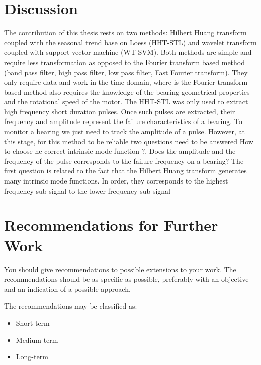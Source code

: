\documentclass[thesis.tex]{subfiles}
\begin{document}
	\section{Discussion}
	\label{sec:discussion}
	The contribution of this thesis rests on two methods: Hilbert Huang transform coupled with the seasonal trend base on Loess (HHT-STL) and wavelet transform coupled with support vector machine (WT-SVM). Both methods are simple and require less transformation as opposed to the Fourier transform based method (band pass filter, high pass filter, low pass filter, Fast Fourier transform). They only require data and work in the time domain, where is the Fourier transform based method also requires the knowledge of the bearing geometrical properties and the rotational speed of the motor.
	\justify
	The HHT-STL was only used to extract high frequency short duration pulses. Once such pulses are extracted, their frequency and amplitude represent the failure characteristics of a bearing. To monitor a bearing we just need to track the amplitude of a pulse. However, at this stage, for this method to be reliable two questions need to be answered 
	\justify
	How to choose he correct intrinsic mode function ?. Does the amplitude and the frequency of the pulse corresponds to the failure frequency on a bearing? 
	The first question is related to the fact that the Hilbert Huang transform generates many intrinsic mode functions. In order, they corresponds to the highest frequency sub-signal to the lower frequency sub-signal
	\section{Recommendations for Further Work}
	\label{sec:recommendations_for_further_work}
	You should give recommendations to possible extensions to your work. 
	The recommendations should be as specific as possible, preferably with an objective and an indication of a possible approach.
	
	The recommendations may be classified as:
	\begin{itemize}
		\item Short-term
		\item Medium-term
		\item Long-term
	\end{itemize}
	
\end{document}
